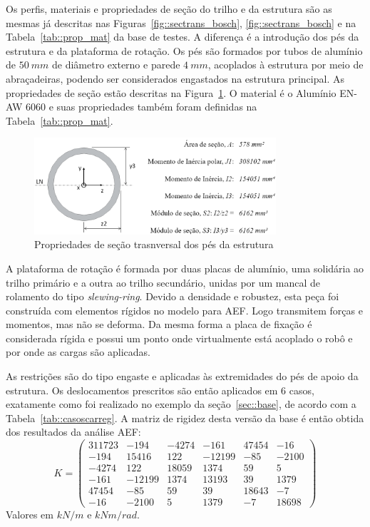 Os perfis, materiais e propriedades de seção do trilho e da estrutura são as
mesmas já descritas nas Figuras~\ref{fig::sectrans_bosch},
\ref{fig::sectrans_bosch} e na Tabela~\ref{tab::prop_mat} da base de testes. A
diferença é a introdução dos pés da estrutura e da plataforma de rotação. Os pés
são formados por tubos de alumínio de $50~mm$ de diâmetro externo e parede
$4~mm$, acoplados à estrutura por meio de abraçadeiras, podendo ser
considerados engastados na estrutura principal.
As propriedades de seção estão descritas na Figura~\ref{fig::sectrans_pes}. O
material é o Alumínio EN-AW 6060 e suas propriedades também foram definidas na
Tabela~\ref{tab::prop_mat}.

\begin{figure}[h]
	\centering 
 	\includegraphics[width=0.80\textwidth]{figs/sectrans_pes}
 	\caption{Propriedades de seção trasnversal dos pés da estrutura}
 	\label{fig::sectrans_pes}
\end{figure}

A plataforma de rotação é formada por duas placas de alumínio, uma solidária ao
trilho primário e a outra ao trilho secundário, unidas por um mancal de
rolamento do tipo \textit{slewing-ring}. Devido a densidade e robustez, esta peça foi
construída com elementos rígidos no modelo para AEF. Logo transmitem forças e
momentos, mas não se deforma. Da mesma forma a placa de fixação é considerada
rígida e possui um ponto onde virtualmente está acoplado o robô e por onde as
cargas são aplicadas.

As restrições são do tipo engaste e aplicadas às extremidades do pés de apoio da
estrutura. Os deslocamentos prescritos são então aplicados em 6 casos,
exatamente como foi realizado no exemplo da seção~\ref{sec::base}, de acordo com a
Tabela~\ref{tab::casoscarreg}. A matriz de rigidez desta versão da base é então
obtida dos resultados da análise AEF:
%
\begin{equation}
	K = 
\begin{pmatrix}
311723	&	-194	&	-4274	&	-161	&	47454	&	-16 \\
-194	&	15416	&	122	&	-12199	&	-85	&	-2100 \\
-4274	&	122	&	18059	&	1374	&	59	&	5 \\
-161	&	-12199	&	1374	&	13193	&	39	&	1379 \\
47454	&	-85	&	59	&	39	&	18643	&	-7 \\
-16	&	-2100	&	5	&	1379	&	-7	&	18698
\end{pmatrix}
\end{equation}
%
Valores em $kN/m$ e $kNm/rad$.

